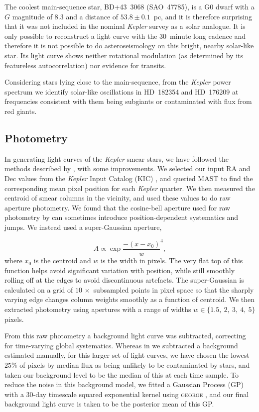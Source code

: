 \documentclass[a4paper,fleqn,usenatbib]{mnras}
\newcommand{\kepler}{\textit{Kepler}\xspace}
\begin{document}
The coolest main-sequence star, BD+43~3068 (SAO~47785), is a G0 dwarf with a $G$ magnitude of 8.3 and a distance of $53.8 \pm 0.1$~pc, and it is therefore surprising that it was not included in the nominal \kepler survey as a solar analogue. It is only possible to reconstruct a light curve with the 30~minute long cadence and therefore it is not possible to do asteroseismology on this bright, nearby solar-like star. Its light curve shows neither rotational modulation (as determined by its featureless autocorrelation) nor evidence for transits.

Considering stars lying close to the main-sequence, from the \kepler power spectrum we identify solar-like oscillations in HD~182354 and HD~176209 at frequencies consistent with them being subgiants or contaminated with flux from red giants. 


\subsection{Photometry}
\label{photometry}

In generating light curves of the \kepler smear stars, we have followed the methods described by \citet{smear}, with some improvements. We selected our input RA and Dec values from the \kepler Input Catalog (KIC) \citep{kic}, and queried MAST to find the corresponding mean pixel position for each \kepler quarter. We then measured the centroid of smear columns in the vicinity, and used these values to do raw aperture photometry. We found that the cosine-bell aperture used for raw photometry by \citet{smear} can sometimes introduce position-dependent systematics and jumps. We instead used a super-Gaussian aperture, 

\begin{equation}
A \propto \exp{\dfrac{-(x-x_0)}{w} ^ 4},
\end{equation}
\noindent where $x_0$ is the centroid and $w$ is the width in pixels. The very flat top of this function helps avoid significant variation with position, while still smoothly rolling off at the edges to avoid discontinuous artefacts. The super-Gaussian is calculated on a grid of $10\,\times$ subsampled points in pixel space so that the sharply varying edge changes column weights smoothly as a function of centroid. We then extracted photometry using apertures with a range of widths $w \in\{1.5,~2,~3,~4,~5\}$ pixels.

From this raw photometry a background light curve was subtracted, correcting for time-varying global systematics. Whereas in \citet{smear} we subtracted a background estimated manually, for this larger set of light curves, we have chosen the lowest $25\%$ of pixels by median flux as being unlikely to be contaminated by stars, and taken our background level to be the median of this at each time sample. To reduce the noise in this background model, we fitted a Gaussian Process (GP) with a 30-day timescale squared exponential kernel using \textsc{george} \citep{hodlr}, and our final background light curve is taken to be the posterior mean of this GP. 
\end{document}
